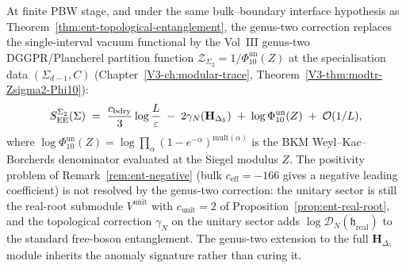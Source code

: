 \begin{remark}
\label{rem:ent-Sigma2-topological}
At finite PBW stage, and under the same bulk--boundary interface
hypothesis as Theorem~\ref{thm:ent-topological-entanglement}, the
genus-two correction replaces the single-interval vacuum functional by
the Vol~III genus-two DGGPR/Plancherel partition function
$\mathcal Z_{\Sigma_2}=1/\Phi_{10}^{\mathrm{un}}(Z)$ at the
specialisation data $(\Sigma_{d-1},C)$
\textup{(}Chapter~\ref{V3-ch:modular-trace},
Theorem~\ref{V3-thm:modtr-Zsigma2-Phi10}\textup{)}:
\[
 S_{\mathrm{EE}}^{\Sigma_2}(\Sigma)
 \;=\;
 \frac{c_{\mathrm{bdry}}}{3}\log\frac{L}{\varepsilon}
 \;-\;
 2\gamma_N(\mathbf H_{\Delta_5})
 \;+\;
 \log\Phi_{10}^{\mathrm{un}}(Z)
 \;+\;
 \mathcal O(1/L),
\]
where $\log\Phi_{10}^{\mathrm{un}}(Z) =
\log\prod_\alpha(1-e^{-\alpha})^{\mathrm{mult}(\alpha)}$
is the BKM Weyl--Kac--Borcherds denominator evaluated at the Siegel
modulus $Z$. The positivity problem of
Remark~\ref{rem:ent-negative} (bulk $c_{\mathrm{eff}} = -166$
gives a negative leading coefficient) is not resolved by the genus-two
correction: the unitary sector is still the real-root submodule
$V^{\mathrm{unit}}$ with $c_{\mathrm{unit}} = 2$ of
Proposition~\ref{prop:ent-real-root}, and the topological
correction $\gamma_N$ on the unitary sector adds
$\log\mathcal D_N(\mathfrak h_{\mathrm{real}})$ to the standard free-boson
entanglement. The genus-two extension to the full $\mathbf H_{\Delta_5}$
module inherits the anomaly signature rather than curing it.
\end{remark}

